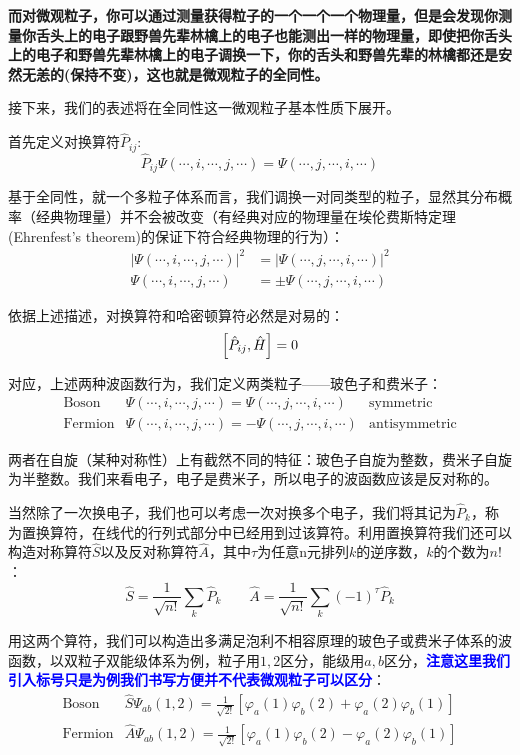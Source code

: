 \textbf{而对微观粒子，你可以通过测量获得粒子的一个一个一个物理量，但是会发现你测量你舌头上的电子跟野兽先辈林檎上的电子也能测出一样的物理量，即使把你舌头上的电子和野兽先辈林檎上的电子调换一下，你的舌头和野兽先辈的林檎都还是安然无恙的(保持不变)，这也就是微观粒子的全同性。}

接下来，我们的表述将在全同性这一微观粒子基本性质下展开。

首先定义对换算符$\hat{P}_{ij}$:
\[\hat{P}_{ij}\varPsi(\cdots,i,\cdots,j,\cdots)=\varPsi(\cdots,j,\cdots,i,\cdots)\]

基于全同性，就一个多粒子体系而言，我们调换一对同类型的粒子，显然其分布概率（经典物理量）并不会被改变（有经典对应的物理量在埃伦费斯特定理(Ehrenfest's theorem)的保证下符合经典物理的行为）：
\[\begin{aligned}
|\varPsi(\cdots,i,\cdots,j,\cdots)|^2&=|\varPsi(\cdots,j,\cdots,i,\cdots)|^2 \\ 
\varPsi(\cdots,i,\cdots,j,\cdots)&=\pm\varPsi(\cdots,j,\cdots,i,\cdots)
\end{aligned}\]

依据上述描述，对换算符和哈密顿算符必然是对易的：
\[\qty[\hat{P}_{ij},\hat{H}]=0\]

对应，上述两种波函数行为，我们定义两类粒子——玻色子和费米子：
\[
    \begin{array}{lll}
        \text{Boson} & \varPsi(\cdots,i,\cdots,j,\cdots)=\varPsi(\cdots,j,\cdots,i,\cdots) & \text{symmetric} \\
        \text{Fermion} & \varPsi(\cdots,i,\cdots,j,\cdots)=-\varPsi(\cdots,j,\cdots,i,\cdots) & \text{antisymmetric}
    \end{array}
\]

两者在自旋（某种对称性）上有截然不同的特征：玻色子自旋为整数，费米子自旋为半整数。我们来看电子，电子是费米子，所以电子的波函数应该是反对称的。

当然除了一次换电子，我们也可以考虑一次对换多个电子，我们将其记为$\hat{P}_k$，称为置换算符，在线代的行列式部分中已经用到过该算符。利用置换算符我们还可以构造对称算符$\hat{S}$以及反对称算符$\hat{A}$，其中$\tau$为任意n元排列$k$的逆序数，$k$的个数为$n!$：
\[\hat{S}=\frac{1}{\sqrt{n!}}\sum_{k}\hat{P}_{k} \qquad \hat{A}=\frac{1}{\sqrt{n!}}\sum_{k}(-1)^{\tau}\hat{P}_{k}\]

用这两个算符，我们可以构造出多满足泡利不相容原理的玻色子或费米子体系的波函数，以双粒子双能级体系为例，粒子用$1,2$区分，能级用$a,b$区分，\textcolor{blue}{\textbf{注意这里我们引入标号只是为例我们书写方便并不代表微观粒子可以区分}}：
\[
    \begin{array}{ll}
        \text{Boson} & \hat{S}\varPsi_{ab}(1,2)=\frac{1}{\sqrt{2!}}[\varphi_a(1)\varphi_b(2)+\varphi_a(2)\varphi_b(1)]\\
        \text{Fermion} & \hat{A}\varPsi_{ab}(1,2)=\frac{1}{\sqrt{2!}}[\varphi_a(1)\varphi_b(2)-\varphi_a(2)\varphi_b(1)] 
    \end{array}
\]

